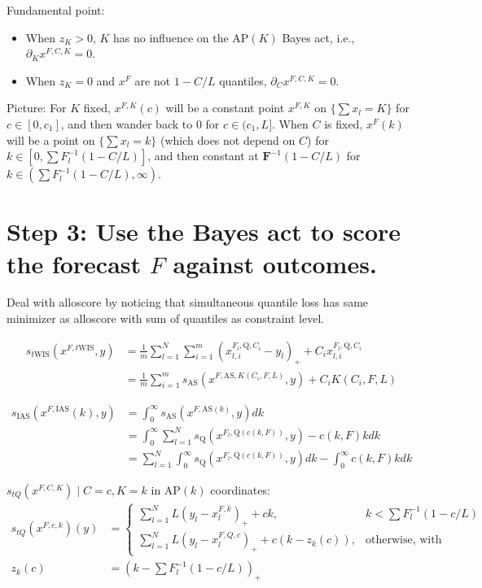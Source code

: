 \documentclass{article}
\begin{document}
Fundamental point: 
\begin{itemize}
\item When $z_K > 0$, $K$ has no influence on the $\mathrm{AP}(K)$ Bayes act, i.e., $\partial_K x^{F,C,K} = 0$.  
\item When $z_K=0$ and $x^F$ are not $1-C/L$ quantiles, $\partial_C x^{F,C,K} = 0$.
\end{itemize}

Picture: For $K$ fixed, $x^{F,K}(c)$ will be a constant point $x^{F,K}$ on $\{\sum x_l = K\}$ for $c \in [0, c_1]$, 
and then wander back to 0 for $c \in (c_1,L]$. When $C$ is fixed, $x^{F}(k)$ will be a point on $\{\sum x_l = k\}$ (which does not depend on $C$)
for $k \in [0, \sum F_l^{-1}(1-C/L)]$, and then constant at $\mathbf{F}^{-1}(1-C/L)$ for $k \in (\sum F_l^{-1}(1-C/L), \infty)$.

\section{Step 3: Use the Bayes act to score the forecast $F$ against outcomes.}

Deal with alloscore by noticing that simultaneous quantile loss has same minimizer as alloscore with sum of quantiles as constraint level.

\begin{align}
s_{t\mathrm{WIS}}(x^{F,t\mathrm{WIS}},y) &= \frac{1}{m}\sum_{l=1}^N \sum_{i=1}^{m}(x_{l,i}^{F_l,\mathrm{Q}, C_i}- y_l)_+  + C_i x_{l,i}^{F_l,\mathrm{Q}, C_i}\\ 
&= \frac{1}{m} \sum_{i=1}^{m}s_{\mathrm{AS}}(x^{F,\mathrm{AS},  K(C_i, F, L)},y) + C_i K(C_i, F, L)
\end{align}

\begin{align}
s_{\mathrm{IAS}}(x^{F, \mathrm{IAS}}(k), y) &= \int_0^{\infty} s_{\mathrm{AS}}(x^{F, \mathrm{AS}(k)}, y) dk \\
&= \int_0^{\infty} \sum_{l=1}^N s_{\mathrm{Q}}(x^{F_l, \mathrm{Q}(c(k, F))}, y) - c(k, F)kdk \\
&= \sum_{l=1}^N \int_0^{\infty} s_{\mathrm{Q}}(x^{F_l, \mathrm{Q}(c(k, F))}, y) dk -  \int_0^{\infty} c(k, F)kdk
\end{align}


$s_{tQ}(x^{F,C,K}) \mid C = c, K = k$ in $\mathrm{AP}(k)$ coordinates:
\begin{align}
s_{tQ}(x^{F,c,k})(y) &= 
\begin{cases}
\sum_{l=1}^{N}L(y_l - x_l^{F,k})_{+} + ck, & k < \sum F_l^{-1}(1-c/L) \\
\sum_{l=1}^{N}L(y_l - x_l^{F,Q,c})_{+} + c(k - z_k(c)), & \text{otherwise, with } 
\end{cases} \\
z_k(c) &= (k -  \sum F_l^{-1}(1-c/L))_{+}
\end{align}
\end{document}
